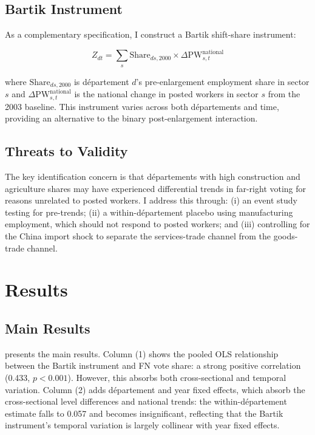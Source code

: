 \documentclass[12pt]{article}
\begin{document}
\subsection{Bartik Instrument}

As a complementary specification, I construct a Bartik shift-share instrument:

\begin{equation}
Z_{dt} = \sum_s \text{Share}_{ds,2000} \times \Delta \text{PW}_{s,t}^{\text{national}}
\end{equation}

\noindent where $\text{Share}_{ds,2000}$ is d\'epartement $d$'s pre-enlargement employment share in sector $s$ and $\Delta \text{PW}_{s,t}^{\text{national}}$ is the national change in posted workers in sector $s$ from the 2003 baseline. This instrument varies across both d\'epartements and time, providing an alternative to the binary post-enlargement interaction.

\subsection{Threats to Validity}

The key identification concern is that d\'epartements with high construction and agriculture shares may have experienced differential trends in far-right voting for reasons unrelated to posted workers. I address this through: (i) an event study testing for pre-trends; (ii) a within-d\'epartement placebo using manufacturing employment, which should not respond to posted workers; and (iii) controlling for the China import shock to separate the services-trade channel from the goods-trade channel.

\section{Results}

\subsection{Main Results}

 presents the main results. Column (1) shows the pooled OLS relationship between the Bartik instrument and FN vote share: a strong positive correlation (0.433, $p < 0.001$). However, this absorbs both cross-sectional and temporal variation. Column (2) adds d\'epartement and year fixed effects, which absorb the cross-sectional level differences and national trends: the within-d\'epartement estimate falls to 0.057 and becomes insignificant, reflecting that the Bartik instrument's temporal variation is largely collinear with year fixed effects.
\end{document}
